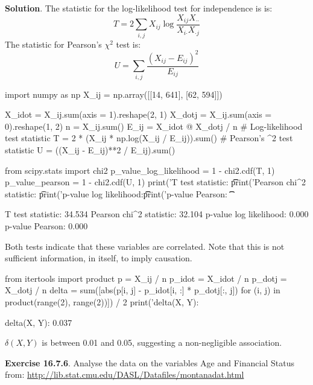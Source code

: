 \textbf{Solution}.
The statistic for the log-likelihood test for independence is is:
\[
T = 2 \sum_{i, j} X_{ij} \log \frac{X_{ij} X_{\text{··}}}{X_{i\text{·}} X_{\text{·}j}}
\]
The statistic for Pearson's \(\chi^{2}\) test is:
\[
U = \sum_{i, j} \frac{(X_{ij} - E_{ij})^{2}}{E_{ij}}
\]

\begin{python}
import numpy as np
X_ij = np.array([[14, 641], [62, 594]])
\end{python}

\begin{python}
X_idot = X_ij.sum(axis = 1).reshape(2, 1)
X_dotj = X_ij.sum(axis = 0).reshape(1, 2)
n = X_ij.sum()
E_ij = X_idot @ X_dotj / n
# Log-likelihood test statistic
T = 2 * (X_ij * np.log(X_ij / E_ij)).sum()
# Pearson's \chi^{2} test statistic
U = ((X_ij - E_ij)**2 / E_ij).sum()
\end{python}

\begin{python}
from scipy.stats import chi2
p_value_log_likelihood = 1 - chi2.cdf(T, 1)
p_value_pearson = 1 - chi2.cdf(U, 1)
print('T test statistic: \t\t%
print('Pearson chi^{2} statistic: \t%
print('p-value log likelihood:\t\t %
print('p-value Pearson: \t\t %
\end{python}
\begin{console}
T test statistic:               34.534
Pearson chi^{2} statistic:        32.104
p-value log likelihood:          0.000
p-value Pearson:                 0.000
\end{console}
Both tests indicate that these variables are correlated. Note that this
is not sufficient information, in itself, to imply causation.

\begin{python}
from itertools import product
p = X_ij / n
p_idot = X_idot / n
p_dotj = X_dotj / n
delta = sum([abs(p[i, j] - p_idot[i, :] * p_dotj[:, j]) 
            for (i, j) in product(range(2), range(2))]) / 2
print('delta(X, Y): %
\end{python}
\begin{console}
delta(X, Y): 0.037
\end{console}
\(\delta(X, Y)\) is between 0.01 and 0.05, suggesting a non-negligible
association.

\textbf{Exercise 16.7.6}. Analyse the data on the variables Age and
Financial Status from:
\url{http://lib.stat.cmu.edu/DASL/Datafiles/montanadat.html}

